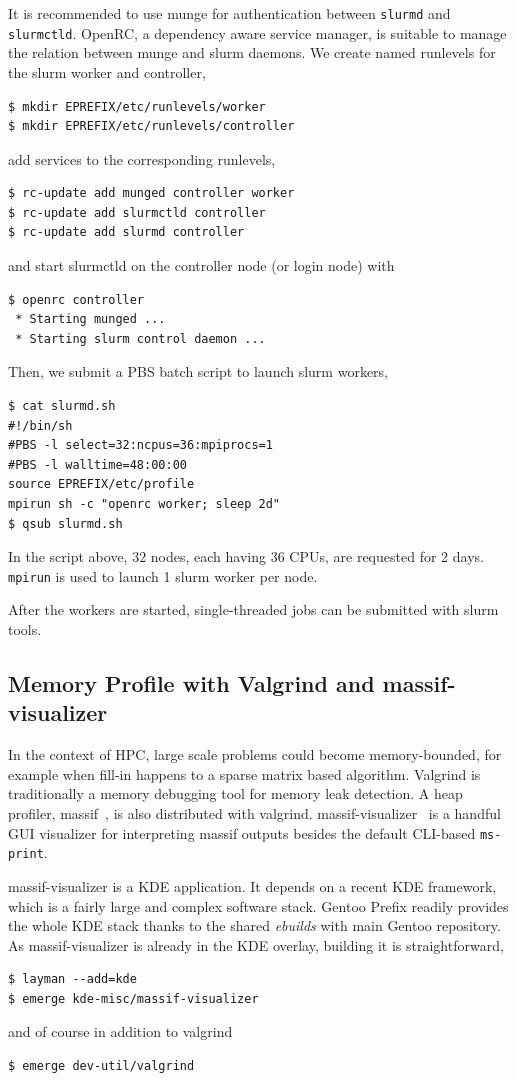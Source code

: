 \documentclass[a4paper,conference]{IEEEtran}
\begin{document}
It is recommended to use munge for authentication between
\texttt{slurmd} and \texttt{slurmctld}. OpenRC, a dependency aware
service manager, is suitable to manage the relation between munge and
slurm daemons. We create named runlevels for the slurm worker and controller,
\begin{verbatim}
$ mkdir EPREFIX/etc/runlevels/worker
$ mkdir EPREFIX/etc/runlevels/controller
\end{verbatim}
add services to the corresponding runlevels,
\begin{verbatim}
$ rc-update add munged controller worker
$ rc-update add slurmctld controller
$ rc-update add slurmd controller
\end{verbatim}
and start slurmctld on the controller node (or login node) with
\begin{verbatim}
$ openrc controller
 * Starting munged ...
 * Starting slurm control daemon ...
\end{verbatim}
Then, we submit a PBS batch script to launch slurm workers,
\begin{verbatim}
$ cat slurmd.sh
#!/bin/sh
#PBS -l select=32:ncpus=36:mpiprocs=1
#PBS -l walltime=48:00:00
source EPREFIX/etc/profile
mpirun sh -c "openrc worker; sleep 2d"
$ qsub slurmd.sh
\end{verbatim}
In the script above, 32 nodes, each having 36 CPUs, are requested for 2
days. \texttt{mpirun} is used to launch 1 slurm worker per node.

After the workers are started, single-threaded jobs can be submitted
with slurm tools.

\subsection{Memory Profile with Valgrind and massif-visualizer}
\label{sec:massif}
In the context of HPC, large scale problems could become
memory-bounded, for example when fill-in happens to a sparse matrix
based algorithm. Valgrind is traditionally a memory debugging tool
for memory leak detection. A heap profiler, massif~\cite{massif}, is
also distributed with valgrind.
massif-visualizer~\cite{massif:visualizer} is a handful GUI visualizer
for interpreting massif outputs besides the default CLI-based
\texttt{ms-print}.

massif-visualizer is a KDE application. It depends on a recent KDE
framework, which is a fairly large and complex software stack. Gentoo
Prefix readily provides the whole KDE stack thanks to the shared
\textit{ebuilds} with main Gentoo repository. As massif-visualizer is
already in the KDE overlay, building it is straightforward,
\begin{verbatim}
$ layman --add=kde
$ emerge kde-misc/massif-visualizer
\end{verbatim}
and of course in addition to valgrind
\begin{verbatim}
$ emerge dev-util/valgrind
\end{verbatim}
\end{document}
